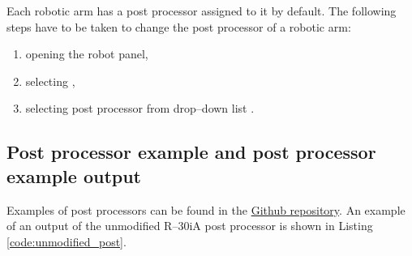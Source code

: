 Each robotic arm has a post processor assigned to it by default. The following steps have to be taken to change the post processor of a robotic arm:


\begin{enumerate}
    \item opening the robot panel,
    \item selecting ,
    \item selecting post processor from drop--down list \cite{selectpost}.
\end{enumerate}

\subsection{Post processor example and post processor example output}

Examples of post processors can be found in the \href{https://github.com/ros-industrial/robodk_postprocessors}{Github repository}. An example of an output of the unmodified R--30iA post processor is shown in Listing \ref{code:unmodified_post}.


